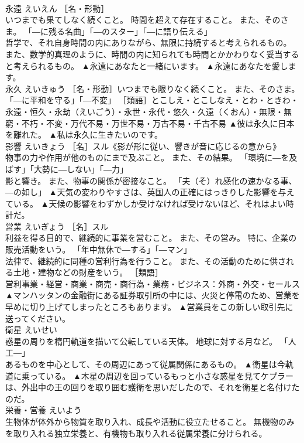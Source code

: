 \documentclass[8pt]{extreport}
\begin{document}
\begin{CJK}{UTF8}{min}
\\	永遠	えいえん	［名・形動］ 
\\	いつまでも果てしなく続くこと。 時間を超えて存在すること。 また、そのさま。 「―に残る名曲」「―のスター」「―に語り伝える」 
\\	哲学で、それ自身時間の内にありながら、無限に持続すると考えられるもの。 また、数学的真理のように、時間の内に知られても時間とかかわりなく妥当すると考えられるもの。	▲永遠にあなたと一緒にいます。 ▲永遠にあなたを愛します。
\\	永久	えいきゅう	［名・形動］いつまでも限りなく続くこと。 また、そのさま。 「―に平和を守る」「―不変」 ［類語］とこしえ・とこしなえ・とわ・ときわ・永遠・恒久・永劫（えいごう）・永世・永代・悠久・久遠（くおん）・無限・無窮・不朽・不変・万代不易・万世不易・万古不易・千古不易	▲彼は永久に日本を離れた。 ▲私は永久に生きたいのです。
\\	影響	えいきょう	［名］スル《影が形に従い、響きが音に応じるの意から》 
\\	物事の力や作用が他のものにまで及ぶこと。 また、その結果。 「環境に―を及ばす」「大勢に―しない」「―力」 
\\	影と響き。 また、物事の関係が密接なこと。 「夫（そ）れ感化の速かなる事、―の如し」	▲天気の変わりやすさは、英国人の正確にはっきりした影響を与えている。 ▲天候の影響をわずかしか受けなければ受けないほど、それはよい時計だ。
\\	営業	えいぎょう	［名］スル 
\\	利益を得る目的で、継続的に事業を営むこと。 また、その営み。 特に、企業の販売活動をいう。 「年中無休で―する」「―マン」 
\\	法律で、継続的に同種の営利行為を行うこと。 また、その活動のために供される土地・建物などの財産をいう。 ［類語］
\\	営利事業・経営・商業・商売・商行為・業務・ビジネス：外商・外交・セールス	▲マンハッタンの金融街にある証券取引所の中には、火災と停電のため、営業を早めに切り上げてしまったところもあります。 ▲営業員をこの新しい取引先に送ってください。
\\	衛星	えいせい	
\\	惑星の周りを楕円軌道を描いて公転している天体。 地球に対する月など。 「人工―」 
\\	あるものを中心として、その周辺にあって従属関係にあるもの。	▲衛星は今軌道に乗っている。 ▲木星の周辺を回っているもっと小さな惑星を見てケプラーは、外出中の王の回りを取り囲む護衛を思いだしたので、それを衛星と名付けたのだ。
\\	栄養・営養	えいよう	
\\	生物体が体外から物質を取り入れ、成長や活動に役立たせること。 無機物のみを取り入れる独立栄養と、有機物も取り入れる従属栄養に分けられる。 

\end{CJK}
\end{document}

